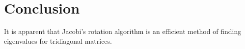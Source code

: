 \section{Conclusion}
It is apparent that Jacobi's rotation algorithm is an efficient method of finding eigenvalues for tridiagonal matrices.





















